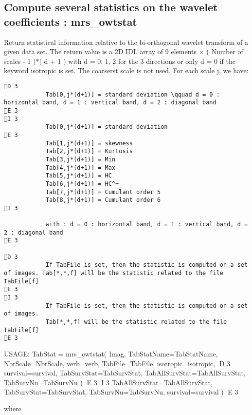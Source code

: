 \subsection{Compute several statistics on the wavelet coefficients : mrs\_owtstat}
Return statistical information relative to the bi-orthogonal wavelet transform of a given data set. The return value is a 2D IDL array 
of 9 elements $\times$ ( Number of scales - 1 )*( d + 1 ) with d = 0, 1, 2 for the 3 directions or only d = 0 if the keyword isotropic is set. 
The coarserst scale is not used. For each scale j, we have:
\begin{verbatim}
D 3
			Tab[0,j*(d+1)] = standard deviation \qquad d = 0 : horizontal band, d = 1 : vertical band, d = 2 : diagonal band
E 3
I 3
			Tab[0,j*(d+1)] = standard deviation
E 3
			Tab[1,j*(d+1)] = skewness
			Tab[2,j*(d+1)] = Kurtosis
			Tab[3,j*(d+1)] = Min
			Tab[4,j*(d+1)] = Max 
			Tab[5,j*(d+1)] = HC
			Tab[6,j*(d+1)] = HC^+
			Tab[7,j*(d+1)] = Cumulant order 5
			Tab[8,j*(d+1)] = Cumulant order 6
I 3
			
			with : d = 0 : horizontal band, d = 1 : vertical band, d = 2 : diagonal band
E 3

D 3
			If TabFile is set, then the statistic is computed on a set of images. Tab[*,*,f] will be the statistic related to the file TabFile[f]
E 3
I 3
			If TabFile is set, then the statistic is computed on a set of images.
			Tab[*,*,f] will be the statistic related to the file TabFile[f]
E 3
\end{verbatim}
{\bf
\begin{center}
     USAGE: TabStat = mrs\_owtstat( Imag, TabStatName=TabStatName, NbrScale=NbrScale, verb=verb, TabFile=TabFile, isotropic=isotropic, 
D 3
     survival=survival, TabSurvStat=TabSurvStat, TabAllSurvStat=TabAllSurvStat, TabSurvNu=TabSurvNu )  
E 3
I 3
     TabAllSurvStat=TabAllSurvStat, TabSurvStat=TabSurvStat, TabSurvNu=TabSurvNu, survival=survival )  
E 3
\end{center}}
where 
